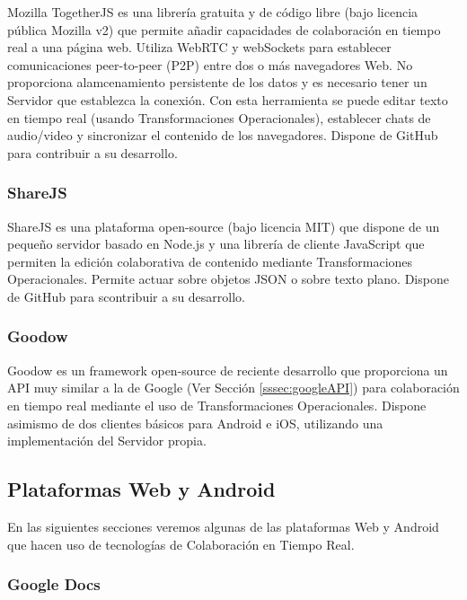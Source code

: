 	Mozilla TogetherJS \cite{ref:togetherjs_api} es una librería gratuita y de código libre (bajo licencia pública Mozilla v2) que permite añadir capacidades de colaboración en tiempo real a una página web. Utiliza WebRTC y webSockets para establecer comunicaciones peer-to-peer (P2P) entre dos o más navegadores Web. No proporciona alamcenamiento persistente de los datos y es necesario tener un Servidor que establezca la conexión. Con esta herramienta se puede editar texto en tiempo real (usando Transformaciones Operacionales), establecer chats de audio/video y sincronizar el contenido de los navegadores. Dispone de GitHub para contribuir a su desarrollo. 	
	
	\subsubsection{ShareJS}

	ShareJS \cite{ref:shareJS} es una plataforma open-source (bajo licencia MIT) que dispone de un pequeño servidor basado en Node.js y una librería de cliente JavaScript que permiten la edición colaborativa de contenido mediante Transformaciones Operacionales. Permite actuar sobre objetos JSON o sobre texto plano. Dispone de GitHub para scontribuir a su desarrollo.
	
	\subsubsection{Goodow}
	
	Goodow \cite{ref:goodow} es un framework open-source de reciente desarrollo que proporciona un API muy similar a la de Google (Ver Sección \ref{sssec:googleAPI}) para colaboración en tiempo real mediante el uso de Transformaciones Operacionales. Dispone asimismo de dos clientes básicos para Android e iOS, utilizando una implementación del Servidor propia.	
	
	\subsection{Plataformas Web y Android}

	En las siguientes secciones veremos algunas de las plataformas Web y Android que hacen uso de tecnologías de Colaboración en Tiempo Real.	
	
	\subsubsection{Google Docs}
	
